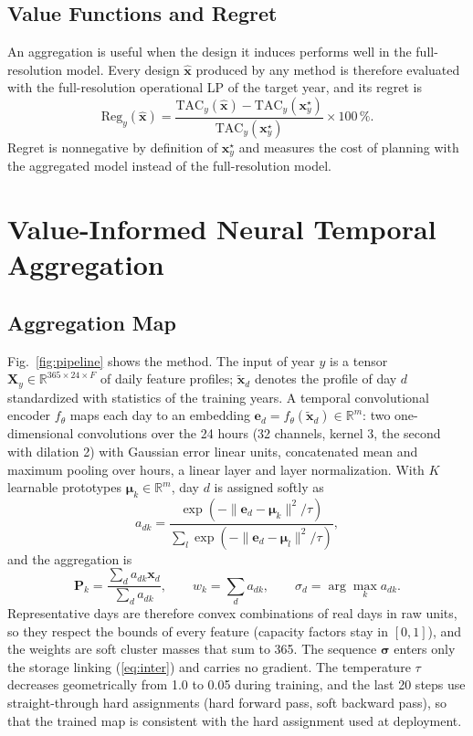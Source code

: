 \documentclass[journal]{IEEEtran}
\begin{document}
\subsection{Value Functions and Regret}
An aggregation is useful when the design it induces performs well in the full-resolution model. Every design $\hat{\bm{x}}$ produced by any method is therefore evaluated with the full-resolution operational LP of the target year, and its regret is
\begin{equation}
\mathrm{Reg}_y(\hat{\bm{x}})=\frac{\mathrm{TAC}_y(\hat{\bm{x}})-\mathrm{TAC}_y(\bm{x}^{\star}_y)}{\mathrm{TAC}_y(\bm{x}^{\star}_y)}\times 100\,\%. \label{eq:regret}
\end{equation}
Regret is nonnegative by definition of $\bm{x}^{\star}_y$ and measures the cost of planning with the aggregated model instead of the full-resolution model.

\section{Value-Informed Neural Temporal Aggregation}\label{sec:method}

\subsection{Aggregation Map}
Fig.~\ref{fig:pipeline} shows the method. The input of year $y$ is a tensor $\bm{X}_y\in\mathbb{R}^{365\times 24\times F}$ of daily feature profiles; $\tilde{\bm{x}}_d$ denotes the profile of day $d$ standardized with statistics of the training years. A temporal convolutional encoder $f_{\theta}$ maps each day to an embedding $\bm{e}_d=f_{\theta}(\tilde{\bm{x}}_d)\in\mathbb{R}^{m}$: two one-dimensional convolutions over the 24 hours (32 channels, kernel 3, the second with dilation 2) with Gaussian error linear units, concatenated mean and maximum pooling over hours, a linear layer and layer normalization. With $K$ learnable prototypes $\bm{\mu}_k\in\mathbb{R}^{m}$, day $d$ is assigned softly as
\begin{equation}
a_{dk}=\frac{\exp(-\|\bm{e}_d-\bm{\mu}_k\|^2/\tau)}{\sum_{l}\exp(-\|\bm{e}_d-\bm{\mu}_l\|^2/\tau)}, \label{eq:assign}
\end{equation}
and the aggregation is
\begin{equation}
\bm{P}_k=\frac{\sum_d a_{dk}\bm{x}_d}{\sum_d a_{dk}},\qquad w_k=\sum_d a_{dk},\qquad \sigma_d=\arg\max_k a_{dk}. \label{eq:agg}
\end{equation}
Representative days are therefore convex combinations of real days in raw units, so they respect the bounds of every feature (capacity factors stay in $[0,1]$), and the weights are soft cluster masses that sum to 365. The sequence $\bm{\sigma}$ enters only the storage linking (\ref{eq:inter}) and carries no gradient. The temperature $\tau$ decreases geometrically from 1.0 to 0.05 during training, and the last 20 steps use straight-through hard assignments (hard forward pass, soft backward pass), so that the trained map is consistent with the hard assignment used at deployment.
\end{document}

